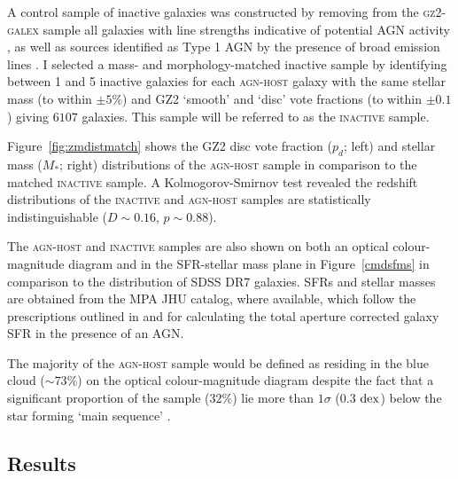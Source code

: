 A control sample of inactive galaxies was constructed by removing from the \textsc{gz2-galex} sample all galaxies with line strengths indicative of potential AGN activity \citep{kauffmann03b}, as well as sources identified as Type 1 AGN by the presence of broad emission lines \citep{Oh15}.  I selected a mass- and morphology-matched inactive sample by identifying between 1 and 5 inactive galaxies for each \textsc{agn-host} galaxy with the same stellar mass (to within $\pm5\%$) and GZ2 `smooth' and `disc' vote fractions (to within $\pm 0.1$) giving $6107$ galaxies. This sample will be referred to as the \textsc{inactive} sample. 


Figure~\ref{fig:zmdistmatch} shows the GZ2 disc vote fraction ($p_d$; left) and stellar mass ($M_*$; right) distributions of the \textsc{agn-host} sample in comparison to the matched \textsc{inactive} sample. A Kolmogorov-Smirnov test revealed the redshift distributions of the \textsc{inactive} and \textsc{agn-host} samples are statistically indistinguishable ($D \sim 0.16$, $p \sim 0.88$). 

The \textsc{agn-host} and \textsc{inactive}  samples are also shown on both an optical colour-magnitude diagram and in the SFR-stellar mass plane in Figure~\ref{cmdsfms} in comparison to the distribution of SDSS DR7 galaxies. SFRs and stellar masses are obtained from the MPA JHU catalog, where available, which follow the prescriptions outlined in \cite{brinchmann04} and \cite{Salim07} for calculating the total aperture corrected galaxy SFR in the presence of an AGN. 

The majority of the \textsc{agn-host} sample would be defined as residing in the blue cloud ($\sim73\%$) on the optical colour-magnitude diagram despite the fact that a significant proportion of the sample ($32\%$) lie more than $1\sigma$ ($0.3$ $\rm{dex}$) below the star forming `main sequence' \citep[][see Figure \ref{cmdsfms} and Table~\ref{table:agnqsubs}]{peng10}.

\subsection{Results}\label{results}


